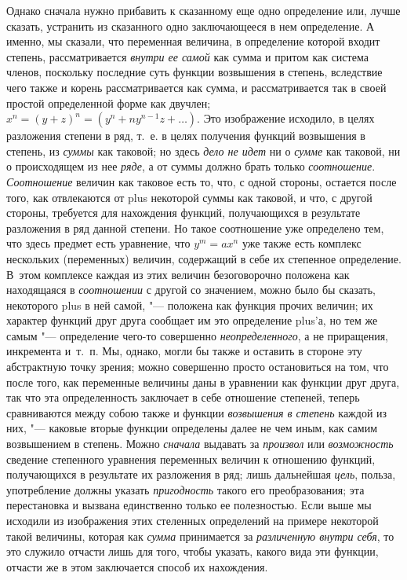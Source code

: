 Однако сначала нужно прибавить к сказанному еще одно определение или, лучше
сказать, устранить из сказанного одно заключающееся в нем определение. А
именно, мы сказали, что переменная величина, в определение которой входит
степень, рассматривается {\em внутри ее самой} как
сумма и притом как система членов, поскольку последние суть функции
возвышения в степень, вследствие чего также и корень рассматривается как
сумма, и рассматривается так в своей простой определенной форме как
двучлен; $x^n = (y + z)^n = (y^n + ny^{n-1}z + \dots)$. Это изображение
исходило, в целях разложения степени в ряд, т.~е. в целях получения функций
возвышения в степень, из {\em суммы} как таковой; но
здесь {\em дело не идет} ни о
{\em сумме} как таковой, ни о происходящем из нее
{\em ряде}, а от суммы должно брать только {\em соотношение}.
{\em Соотношение} величин как таковое есть то, что, с
одной стороны, остается после того, как отвлекаются от plus некоторой суммы
как таковой, и что, с другой стороны, требуется для нахождения функций,
получающихся в результате разложения в ряд данной степени. Но такое
соотношение уже определено тем, что здесь предмет есть уравнение, что 
$y^m = ax^n$ уже также есть комплекс нескольких (переменных) величин,
содержащий в себе их степенное определение. В~этом комплексе каждая из этих
величин безоговорочно положена как находящаяся в
{\em соотношении} с другой со значением, можно было бы
сказать, некоторого plus в ней самой, "--- положена как функция прочих
величин; их характер функций друг друга сообщает им это определение plus'а,
но тем же самым "--- определение чего-то совершенно
{\em неопределенного}, а не приращения, инкремента
и~т.~п. Мы, однако, могли бы также и оставить в стороне эту абстрактную
точку зрения; можно совершенно просто остановиться на том, что после того,
как переменные величины даны в уравнении как функции друг друга, так что
эта определенность заключает в себе отношение степеней, теперь сравниваются
между собою также и функции {\em возвышения в степень}
каждой из них, "--- каковые вторые функции определены далее не чем иным, как
самим возвышением в степень. Можно {\em сначала}
выдавать за {\em произвол} или
{\em возможность} сведение степенного уравнения
переменных величин к отношению функций, получающихся в результате их
разложения в ряд; лишь дальнейшая {\em цель}, польза,
употребление должны указать {\em пригодность} такого
его преобразования; эта перестановка и вызвана единственно только ее
полезностью. Если выше мы исходили из изображения этих стеленных
определений на примере некоторой такой величины, которая как
{\em сумма} принимается за
{\em различенную внутри себя}, то это служило отчасти
лишь для того, чтобы указать, какого вида эти функции, отчасти же в этом
заключается способ их нахождения.

